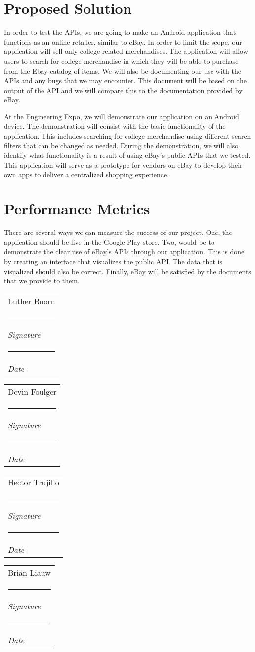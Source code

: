 \documentclass[letterpaper, 10pt, draftclsnofoot, onecolumn]{IEEEtran}
\makeatletter
\newcommand{\namesigdate}[2][6cm]{%
  \begin{tabular}{@{}p{#1}@{}}
    #2 \\[0.5\normalbaselineskip] \hrule \\[0pt]
    {\small \textit{Signature}} \\[0.5\normalbaselineskip] \hrule \\[0pt]
    {\small \textit{Date}}
  \end{tabular}
}
\makeatother
\begin{document}
\section*{Proposed Solution}
	In order to test the APIs, we are going to make an Android application that 
	functions as an online retailer, similar to eBay. In order to limit the scope, 
	our application will sell only college related merchandises. The application 
	will allow users to search for college merchandise in which they will be able 
	to purchase from the Ebay catalog of items. We will also be documenting our 
	use with the APIs and any bugs that we may encounter. This document will be 
	based on the output of the API and we will  compare this to the documentation 
	provided by eBay. 
	\par At the Engineering Expo, we will demonstrate our application on an Android
	 device. The demonstration will consist with the basic functionality of the 
	application. This includes searching for college merchandise using different 
	search filters that can be changed as needed. During the demonstration, we will
	 also identify what functionality is a result of using eBay's public APIs that 
	we tested. This application will serve as a prototype for vendors on eBay to 
	develop their own apps to deliver a centralized shopping experience.

\newpage
\section*{Performance Metrics}
	There are several ways we can measure the success of our project. One, the 
	application should be live in the Google Play store. Two, would be to 
	demonstrate the clear use of eBay's APIs through our application. This is done 
	by creating an interface that visualizes the public API. The data that is 
	visualized should also be correct. Finally, eBay will be satisfied by the 
	documents that we provide to them.


\vspace{2ex}\noindent 
\namesigdate{Luther Boorn} \hfill
\namesigdate{Devin Foulger} \hfill

\vspace{4ex}\noindent
\namesigdate{Hector Trujillo} \hfill
\namesigdate{Brian Liauw} \hfill
\end{document}
